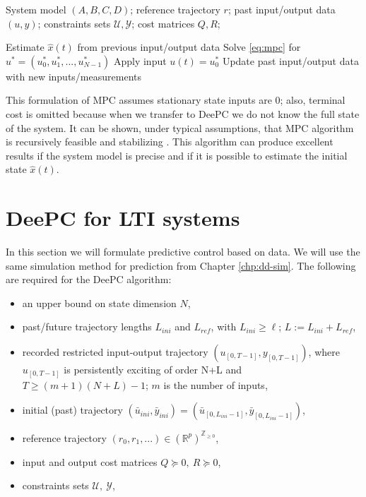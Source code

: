 \documentclass[12pt,a4paper]{report}
\begin{document}
\begin{algorithm}
\caption{Model predictive control (MPC)}
\begin{algorithmic}
\Require System model $(A, B, C, D)$; reference trajectory $r$; past input/output data $(u, y)$; constraints sets $\mathcal{U}, \mathcal{Y}$; cost matrices $Q, R$;

    \State[1] Estimate $\hat{x}(t)$ from previous input/output data
    \State[2] Solve \eqref{eq:mpc} for $u^{*} = (u^{*}_0, u^{*}_1, ..., u^{*}_{N-1})$
    \State[3] Apply input $u(t) = u^{*}_0$
    \State[4] Update past input/output data with new inputs/measurements
\EndFor
\end{algorithmic}
\end{algorithm}

This formulation of MPC assumes stationary state inputs are 0; also, terminal cost is omitted because when we transfer to DeePC we do not know the full state of the system.
It can be shown, under typical assumptions, that MPC algorithm is recursively feasible and stabilizing \cite{mayne2000constrainedmpc}. This algorithm can produce excellent results
if the system model is precise and if it is possible to estimate the initial state $\hat{x}(t)$.


\section{DeePC for LTI systems}
In this section we will formulate predictive control based on data. We will use the same simulation method for prediction from Chapter \ref{chp:dd-sim}.
The following are required for the DeePC algorithm:
\begin{itemize}
    \item[(i)] an upper bound on state dimension $N$,
    \item[(ii)] past/future trajectory lengths $L_{ini}$ and $L_{ref}$, with $L_{ini} \geq \ell$; $L:=L_{ini}+L_{ref}$,
    \item[(iii)] recorded restricted input-output trajectory \((u_{[0, T-1]}, y_{[0, T-1]})\), where $u_{[0, T-1]}$ is persistently exciting of order N+L and $T \geq (m+1)(N+L) - 1$; $m$ is the number of inputs,
    \item[(iv)] initial (past) trajectory \((\bar{u}_{ini}, \bar{y}_{ini}) = (\bar{u}_{[0, L_{ini}-1]}, \bar{y}_{[0, L_{ini}-1]})\),
    \item[(v)] reference trajectory $(r_0, r_1, ...) \in (\mathbb{R}^p)^{\mathbb{Z}_{\geq 0}}$,
    \item[(vi)] input and output cost matrices $Q \succeq 0,\ R \succeq 0$,
    \item[(vii)] constraints sets $\mathcal{U}, \ \mathcal{Y}$,
\end{itemize}
\end{document}
